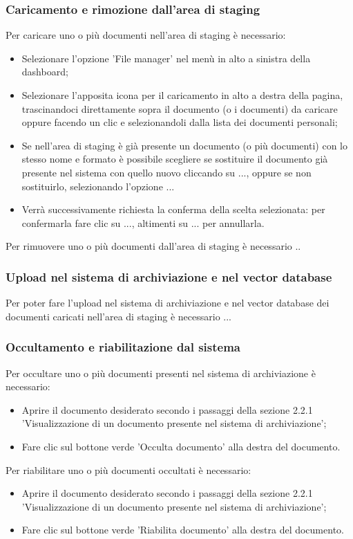 \documentclass[10pt, a4paper]{article}
\begin{document}
\subsubsection{Caricamento e rimozione dall'area di staging}
Per caricare uno o più documenti nell'area di staging è necessario:
\begin{itemize}
    \item Selezionare l'opzione 'File manager' nel menù in alto a sinistra della dashboard;
    \item Selezionare l'apposita icona per il caricamento in alto a destra della pagina, trascinandoci direttamente sopra il documento (o i documenti) da caricare oppure facendo un clic e selezionandoli dalla lista dei documenti personali;
    \item Se nell'area di staging è già presente un documento (o più documenti) con lo stesso nome e formato è possibile scegliere se sostituire il documento già presente nel sistema con quello nuovo cliccando su ..., oppure se non sostituirlo, selezionando l'opzione ... 
    \item  Verrà successivamente richiesta la conferma della scelta selezionata: per confermarla fare clic su ..., altimenti su ... per annullarla.
    \end{itemize} 
Per rimuovere uno o più documenti dall'area di staging è necessario ..


\subsubsection{Upload nel sistema di archiviazione e nel vector database}
Per poter fare l’upload nel sistema di archiviazione e nel vector database dei documenti caricati nell’area di staging è necessario ...

\subsubsection{Occultamento e riabilitazione dal sistema}
Per occultare uno o più documenti presenti nel sistema di archiviazione è necessario:
\begin{itemize}
    \item Aprire il documento desiderato secondo i passaggi della sezione 2.2.1 'Visualizzazione di un documento presente nel sistema di archiviazione';
    \item Fare clic sul bottone verde 'Occulta documento' alla destra del documento.
\end{itemize}
Per riabilitare uno o più documenti occultati è necessario:
\begin{itemize}
    \item Aprire il documento desiderato secondo i passaggi della sezione 2.2.1 'Visualizzazione di un documento presente nel sistema di archiviazione';
    \item Fare clic sul bottone verde 'Riabilita documento' alla destra del documento.
\end{itemize}
\end{document}
